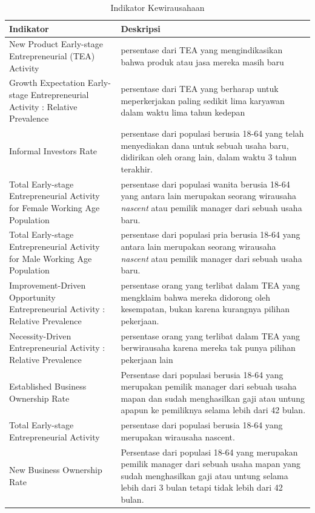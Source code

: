 \begin{table}[H]
\centering
\caption{Indikator Kewirausahaan}
\begin{tabular}{|p{4cm}|p{10cm}|}
\hline
Indikator & Deskripsi\\
\hline
New Product Early-stage Entrepreneurial (TEA) Activity & persentase dari TEA yang mengindikasikan bahwa produk atau jasa mereka masih baru\\
\hline
Growth Expectation Early-stage Entrepreneurial Activity : Relative Prevalence & persentase dari TEA yang berharap untuk meperkerjakan paling sedikit lima karyawan dalam waktu lima tahun kedepan\\
\hline
Informal Investors Rate & persentase dari populasi berusia 18-64 yang telah menyediakan dana untuk sebuah usaha baru, didirikan oleh orang lain, dalam waktu 3 tahun terakhir.\\
\hline
Total Early-stage Entrepreneurial Activity for Female Working Age Population & persentase dari populasi wanita berusia 18-64 yang antara lain merupakan seorang wirausaha \textit{nascent} atau pemilik manager dari sebuah usaha baru.\\
\hline
Total Early-stage Entrepreneurial Activity for Male Working Age Population & persentase dari populasi pria berusia 18-64 yang antara lain merupakan seorang wirausaha \textit{nascent} atau pemilik manager dari sebuah usaha baru.\\
\hline
Improvement-Driven Opportunity Entrepreneurial Activity : Relative Prevalence & persentase orang yang terlibat dalam TEA yang mengklaim bahwa mereka didorong oleh kesempatan, bukan karena kurangnya pilihan pekerjaan.\\
\hline
Necessity-Driven Entrepreneurial Activity : Relative Prevalence & persentase orang yang terlibat dalam TEA yang berwirausaha karena mereka tak punya pilihan pekerjaan lain\\
\hline
Established Business Ownership Rate & Persentase dari populasi berusia 18-64 yang merupakan pemilik manager dari sebuah usaha mapan dan sudah menghasilkan gaji atau untung apapun ke pemiliknya selama lebih dari 42 bulan.\\
\hline
Total Early-stage Entrepreneurial Activity & persentase dari populasi berusia 18-64 yang merupakan wirausaha nascent.\\
\hline
New Business Ownership Rate & Persentase dari populasi 18-64 yang merupakan pemilik manager dari sebuah usaha mapan yang sudah menghasilkan gaji atau untung selama lebih dari 3 bulan tetapi tidak lebih dari 42 bulan.\\

\end{tabular}
\end{table}
